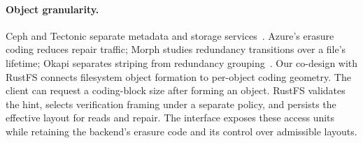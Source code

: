 \paragraph{Object granularity.}
Ceph and Tectonic separate metadata and storage
services~\cite{ceph2006,tectonic2021}. Azure's erasure coding reduces repair
traffic; Morph studies redundancy transitions over a file's lifetime;
Okapi separates striping from redundancy
grouping~\cite{azureec2012,morph2024,okapi2025}. Our co-design with RustFS
connects filesystem object formation to per-object coding geometry.
The client can request a coding-block size after forming an object.
RustFS validates the hint, selects verification framing under a separate
policy, and persists the effective layout for reads and repair. The
interface exposes these access units while retaining the backend's
erasure code and its control over admissible layouts.
